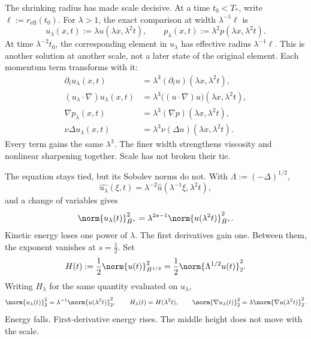 
The shrinking radius has made scale decisive.
At a time \(t_0<T_*\), write \(\ell:=r_{\mathrm{eff}}(t_0)\).
For \(\lambda>1\), the exact \NavierStokes{} comparison at width \(\lambda^{-1}\ell\) is
\[
  u_\lambda(x,t)
  :=
  \lambda u(\lambda x,\lambda^2t),
  \qquad
  p_\lambda(x,t)
  :=
  \lambda^2p(\lambda x,\lambda^2t).
\]
At time \(\lambda^{-2}t_0\), the corresponding element in \(u_\lambda\) has effective radius \(\lambda^{-1}\ell\).
This is another solution at another scale, not a later state of the original element.
Each momentum term transforms with it:
\[
\begin{aligned}
  \partial_tu_\lambda(x,t)
  &=
  \lambda^3(\partial_tu)(\lambda x,\lambda^2t),
  \\
  (u_\lambda\cdot\nabla)u_\lambda(x,t)
  &=
  \lambda^3\bigl((u\cdot\nabla)u\bigr)(\lambda x,\lambda^2t),
  \\
  \nabla p_\lambda(x,t)
  &=
  \lambda^3(\nabla p)(\lambda x,\lambda^2t),
  \\
  \nu\Delta u_\lambda(x,t)
  &=
  \lambda^3\nu(\Delta u)(\lambda x,\lambda^2t).
\end{aligned}
\]
Every term gains the same \(\lambda^3\).
The finer width strengthens viscosity and nonlinear sharpening together.
Scale has not broken their tie.


The equation stays tied, but its Sobolev norms do not.
With \(\Lambda:=(-\Delta)^{1/2}\),
\[
  \widehat{u_\lambda}(\xi,t)
  =
  \lambda^{-2}\widehat u(\lambda^{-1}\xi,\lambda^2t),
\]
and a change of variables gives
\[
  \norm{u_\lambda(t)}_{\dot H^s}^2
  =
  \lambda^{2s-1}
  \norm{u(\lambda^2t)}_{\dot H^s}^2.
\]
Kinetic energy loses one power of \(\lambda\).
The first derivatives gain one.
Between them, the exponent vanishes at \(s=\tfrac12\).
Set
\[
  H(t)
  :=
  \frac12\norm{u(t)}_{\dot H^{1/2}}^2
  =
  \frac12\norm{\Lambda^{1/2}u(t)}_2^2.
\]
Writing \(H_\lambda\) for the same quantity evaluated on \(u_\lambda\),
\[
  \norm{u_\lambda(t)}_2^2
  =
  \lambda^{-1}\norm{u(\lambda^2t)}_2^2,
  \qquad
  H_\lambda(t)=H(\lambda^2t),
  \qquad
  \norm{\nabla u_\lambda(t)}_2^2
  =
  \lambda\norm{\nabla u(\lambda^2t)}_2^2.
\]
Energy falls.
First-derivative energy rises.
The middle height does not move with the scale.


